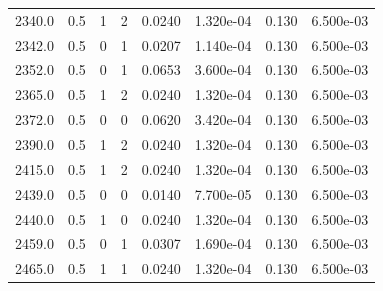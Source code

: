 \documentclass[preview]{standalone}
\begin{document}
{{{{{\begin{tabular}{L{1.2cm}C{1.2cm} C{0.3cm}C{0.5cm} C{1.4cm}C{1.4cm} C{1.4cm}C{1.4cm}}
  2340.0  &   0.5  & 1     &  2 &  0.0240  & 1.320e-04  & 0.130 &  6.500e-03   \\ 
  2342.0  &   0.5  & 0     &  1 &  0.0207  & 1.140e-04  & 0.130 &  6.500e-03   \\ 
  2352.0  &   0.5  & 0     &  1 &  0.0653  & 3.600e-04  & 0.130 &  6.500e-03   \\ 
  2365.0  &   0.5  & 1     &  2 &  0.0240  & 1.320e-04  & 0.130 &  6.500e-03   \\ 
  2372.0  &   0.5  & 0     &  0 &  0.0620  & 3.420e-04  & 0.130 &  6.500e-03   \\ 
  2390.0  &   0.5  & 1     &  2 &  0.0240  & 1.320e-04  & 0.130 &  6.500e-03   \\ 
  2415.0  &   0.5  & 1     &  2 &  0.0240  & 1.320e-04  & 0.130 &  6.500e-03   \\ 
  2439.0  &   0.5  & 0     &  0 &  0.0140  & 7.700e-05  & 0.130 &  6.500e-03   \\ 
  2440.0  &   0.5  & 1     &  0 &  0.0240  & 1.320e-04  & 0.130 &  6.500e-03   \\ 
  2459.0  &   0.5  & 0     &  1 &  0.0307  & 1.690e-04  & 0.130 &  6.500e-03   \\ 
  2465.0  &   0.5  & 1     &  1 &  0.0240  & 1.320e-04  & 0.130 &  6.500e-03   \\ 
\hline 
\end{tabular} 

}}}}}
\end{document}
